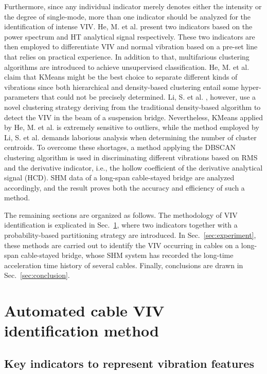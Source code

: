 \documentclass[preprint, 3p, times, compress, 11pt]{elsarticle}
\begin{document}
Furthermore, since any individual indicator merely denotes either the 
intensity or the degree of single-mode, more than one indicator should 
be analyzed for the identification of intense VIV. 
He, M. et al. \cite{he2022online} 
present two indicators based on the power spectrum and HT analytical 
signal respectively. These two indicators are then employed to 
differentiate VIV and normal vibration based on a pre-set line that 
relies on practical experience. In addition to that, multifarious 
clustering algorithms are introduced to achieve unsupervised 
classification. He, M. et al. \cite{he2022identification} claim that 
KMeans might be the best choice to separate different kinds of vibrations 
since both hierarchical and density-based clustering entail some 
hyper-parameters that could not be precisely determined. Li, S. et al. 
\cite{li2017cluster}, however, use a novel clustering strategy deriving 
from the traditional density-based algorithm to detect the VIV in the 
beam of a suspension bridge. Nevertheless, KMeans applied by He, M. et al. 
\cite{he2022identification} is extremely sensitive to outliers, while the method 
employed by Li, S. et al. \cite{li2017cluster} demands laborious analysis 
when determining the number of cluster centroids. To overcome these 
shortages, a method applying the DBSCAN clustering algorithm is used 
in discriminating different vibrations based on RMS and the derivative 
indicator, i.e., the hollow coefficient of the derivative analytical 
signal (HCD). SHM data of a long-span cable-stayed bridge are analyzed 
accordingly, and the result proves both the accuracy and efficiency of 
such a method.

The remaining sections are organized as follows. The methodology of VIV 
identification is explicated in Sec.~\ref{sec:method}, where two indicators 
together with a probability-based partitioning strategy are introduced. 
In Sec.~\ref{sec:experiment}, these methods are carried out to identify 
the VIV occurring in cables on a long-span cable-stayed bridge, whose 
SHM system has recorded the long-time acceleration time history of several
cables. Finally, conclusions are drawn in Sec.~\ref{sec:conclusion}.

\section{Automated cable VIV identification method}
\label{sec:method}

\subsection{Key indicators to represent vibration features} 
  
\end{document}
